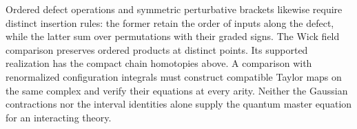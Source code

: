 Ordered defect operations and symmetric perturbative brackets likewise
require distinct insertion rules: the former retain the order of
inputs along the defect, while the latter sum over permutations with
their graded signs.  The Wick field comparison
preserves ordered products at distinct points.  Its supported realization
has the compact chain homotopies above.  A comparison with renormalized
configuration integrals must construct compatible Taylor maps on the
same complex and verify their equations at every arity.  Neither the Gaussian contractions nor the interval identities
alone supply the quantum master equation for an interacting theory.
